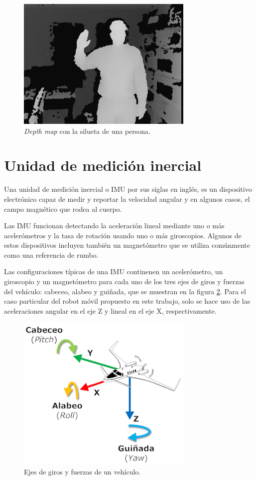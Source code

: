 \begin{figure}[ht]
    \centering
    \includegraphics[scale=2.5]{./Figures/depth_map.png}
    \caption{\textit{Depth map} con la silueta de una persona.\protect\footnotemark}
    \label{fig:depthMap}
\end{figure}


\section{Unidad de medición inercial}

Una unidad de medición inercial o IMU por sus siglas en inglés, es un dispositivo electrónico capaz de medir y reportar la velocidad angular y en algunos casos, el campo magnético que rodea al cuerpo.

Las IMU funcionan detectando la aceleración lineal mediante uno o más acelerómetros y la tasa de rotación usando uno o más giroscopios. Algunos de estos dispositivos incluyen también un magnetómetro que se utiliza comúnmente como una referencia de rumbo.

Las configuraciones típicas de una IMU continenen un acelerómetro, un giroscopio y un magnetómetro para cada uno de los tres ejes de giros y fuerzas del vehículo: cabeceo, alabeo y guiñada, que se muestran en la figura \ref{fig:girosYFuerzas}. Para el caso particular del robot móvil propuesto en este trabajo, solo se hace uso de las aceleraciones angular en el eje Z y lineal en el eje X, respectivamente.

\begin{figure}[ht]
    \centering
    \includegraphics[scale=2.0]{./Figures/imu.png}
    \caption{Ejes de giros y fuerzas de un vehículo.\protect\footnotemark}
    \label{fig:girosYFuerzas}
\end{figure}

